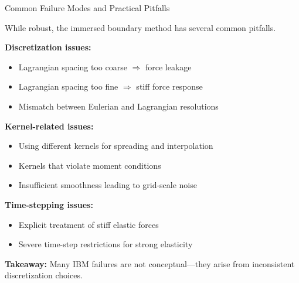 \documentclass{beamer}
\begin{document}
\begin{frame}{Common Failure Modes and Practical Pitfalls}
\small

While robust, the immersed boundary method has several common pitfalls.

\medskip

\textbf{Discretization issues:}
\begin{itemize}
    \item Lagrangian spacing too coarse $\Rightarrow$ force leakage
    \item Lagrangian spacing too fine $\Rightarrow$ stiff force response
    \item Mismatch between Eulerian and Lagrangian resolutions
\end{itemize}

\medskip

\textbf{Kernel-related issues:}
\begin{itemize}
    \item Using different kernels for spreading and interpolation
    \item Kernels that violate moment conditions
    \item Insufficient smoothness leading to grid-scale noise
\end{itemize}

\medskip

\textbf{Time-stepping issues:}
\begin{itemize}
    \item Explicit treatment of stiff elastic forces
    \item Severe time-step restrictions for strong elasticity
\end{itemize}

\medskip

\textbf{Takeaway:}  
Many IBM failures are not conceptual—they arise from inconsistent
discretization choices.

\end{frame}
\end{document}
